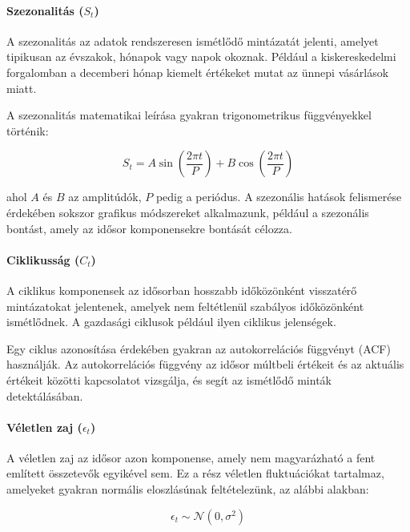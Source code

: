 \documentclass[11pt]{article}
\begin{document}
\paragraph{\texorpdfstring{Szezonalitás
(\(S_t\))}{Szezonalitás (S\_t)}}\label{szezonalituxe1s-s_t}

A szezonalitás az adatok rendszeresen ismétlődő mintázatát jelenti,
amelyet tipikusan az évszakok, hónapok vagy napok okoznak. Például a
kiskereskedelmi forgalomban a decemberi hónap kiemelt értékeket mutat az
ünnepi vásárlások miatt.

A szezonalitás matematikai leírása gyakran trigonometrikus függvényekkel
történik:

\[S_t = A \sin\left(\frac{2\pi t}{P}\right) + B \cos\left(\frac{2\pi t}{P}\right)\]

ahol \(A\) és \(B\) az amplitúdók, \(P\) pedig a periódus. A szezonális
hatások felismerése érdekében sokszor grafikus módszereket alkalmazunk,
például a szezonális bontást, amely az idősor komponensekre bontását
célozza.

\paragraph{\texorpdfstring{Ciklikusság
(\(C_t\))}{Ciklikusság (C\_t)}}\label{ciklikussuxe1g-c_t}

A ciklikus komponensek az idősorban hosszabb időközönként visszatérő
mintázatokat jelentenek, amelyek nem feltétlenül szabályos időközönként
ismétlődnek. A gazdasági ciklusok például ilyen ciklikus jelenségek.

Egy ciklus azonosítása érdekében gyakran az autokorrelációs függvényt
(ACF) használják. Az autokorrelációs függvény az idősor múltbeli
értékeit és az aktuális értékeit közötti kapcsolatot vizsgálja, és segít
az ismétlődő minták detektálásában.

\paragraph{\texorpdfstring{Véletlen zaj
(\(\epsilon_t\))}{Véletlen zaj (\textbackslash epsilon\_t)}}\label{vuxe9letlen-zaj-epsilon_t}

A véletlen zaj az idősor azon komponense, amely nem magyarázható a fent
említett összetevők egyikével sem. Ez a rész véletlen fluktuációkat
tartalmaz, amelyeket gyakran normális eloszlásúnak feltételezünk, az
alábbi alakban:

\[\epsilon_t \sim \mathcal{N}(0, \sigma^2)\]
\end{document}
